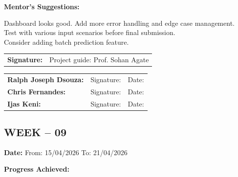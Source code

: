 \documentclass[12pt,a4paper]{article}
\begin{document}
\medskip

\noindent\textbf{Mentor's Suggestions:}

\medskip

\noindent Dashboard looks good. Add more error handling and edge case management. \\
Test with various input scenarios before final submission. \\
Consider adding batch prediction feature.

\medskip

\noindent\begin{tabular}{p{4cm} p{6cm}}
\textbf{Signature:} & Project guide: Prof. Sohan Agate \\
\end{tabular}

\medskip

\noindent\begin{tabular}{p{3.5cm} p{5cm} p{3cm}}
\textbf{Ralph Joseph Dsouza:} & Signature: \underline{\hspace{4cm}} & Date: \underline{\hspace{2cm}} \\
\textbf{Chris Fernandes:} & Signature: \underline{\hspace{4cm}} & Date: \underline{\hspace{2cm}} \\
\textbf{Ijas Keni:} & Signature: \underline{\hspace{4cm}} & Date: \underline{\hspace{2cm}} \\
\end{tabular}

\newpage

\subsection*{WEEK – 09}
\vspace{0.3cm}

\textbf{Date:} From: 15/04/2026 To: 21/04/2026

\medskip

\noindent\textbf{Progress Achieved:}

\medskip
\end{document}
